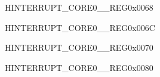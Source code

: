 \begin{register}{H}{INTERRUPT\_CORE0\_\_REG}{0x0068}\label{regdesc:INTERRUPTCORE0SYSTIMERTARGET0INTMAPREG}






\end{register}\vspace{-3em}


\begin{register}{H}{INTERRUPT\_CORE0\_\_REG}{0x006C}\label{regdesc:INTERRUPTCORE0SYSTIMERTARGET1INTMAPREG}






\end{register}\vspace{-3em}


\begin{register}{H}{INTERRUPT\_CORE0\_\_REG}{0x0070}\label{regdesc:INTERRUPTCORE0SYSTIMERTARGET2INTMAPREG}






\end{register}\vspace{-3em}


























\begin{register}{H}{INTERRUPT\_CORE0\_\_REG}{0x0080}\label{regdesc:INTERRUPTCORE0APBADCINTMAPREG}






\end{register}\vspace{-3em}


